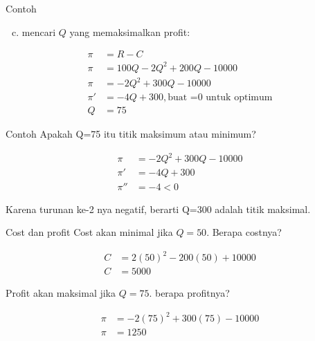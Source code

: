 \documentclass[
  ignorenonframetext,
]{beamer}
\providecommand{\tightlist}{%
  \setlength{\itemsep}{0pt}\setlength{\parskip}{0pt}}\usepackage{longtable,booktabs,array}
\begin{document}
\begin{frame}{Contoh}
\label{contoh-10}
\begin{enumerate}
[a.]
\setcounter{enumi}{2}
\tightlist
\item
  mencari \(Q\) yang memaksimalkan profit:
\end{enumerate}

\[
\begin{align*}
\pi&=R-C \\
\pi&=100Q-2Q^2+200Q-10000 \\
\pi&=-2Q^2+300Q-10000 \\
\pi'&=-4Q+300,\text{buat =0 untuk optimum} \\
Q&=75
\end{align*}
\]
\end{frame}

\begin{frame}{Contoh}
\label{contoh-11}
Apakah Q=75 itu titik maksimum atau minimum?

\[
\begin{align*}
\pi&=-2Q^2+300Q-10000 \\
\pi'&=-4Q+300 \\
\pi''&=-4<0
\end{align*}
\]

Karena turunan ke-2 nya negatif, berarti Q=300 adalah titik maksimal.
\end{frame}

\begin{frame}{Cost dan profit}
\label{cost-dan-profit}
Cost akan minimal jika \(Q=50\). Berapa costnya?

\[
\begin{align*}
C&=2(50)^2-200(50)+10000 \\
C&=5000
\end{align*}
\]

Profit akan maksimal jika \(Q=75\). berapa profitnya?

\[
\begin{align*}
\pi&=-2(75)^2+300(75)-10000 \\
\pi&=1250
\end{align*}
\]
\end{frame}
\end{document}
